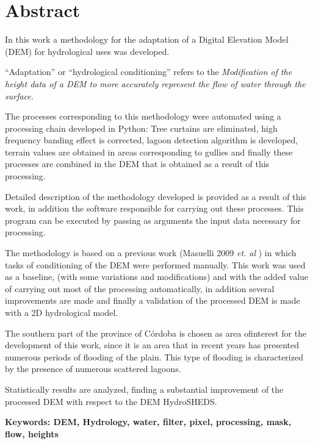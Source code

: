 \chapter*{Abstract}
\label{chap:abstract}

In this work a methodology for the adaptation of a Digital Elevation Model (DEM) for hydrological uses was developed.

"`Adaptation"' or "`hydrological conditioning"' refers to the \textit {Modification of the height data of a DEM to more accurately represent the flow of water through the surface.}

The processes corresponding to this methodology were automated using a processing chain developed in Python: Tree curtains are eliminated, high frequency banding effect is corrected, lagoon detection algorithm is developed, terrain values ​​are obtained in areas corresponding to gullies and finally these processes are combined in the DEM that is obtained as a result of this processing.

Detailed description of the methodology developed is provided as a result of this work, in addition the software responsible for carrying out these processes. This program can be executed by passing as arguments the input data necessary for processing.

The methodology is based on a previous work (Masuelli 2009 \textit {et. al} \cite{Masuelli2009}) in which tasks of conditioning of the DEM were performed manually. This work was used as a baseline, (with some variations and modifications) and with the added value of carrying out most of the processing automatically, in addition several improvements are made and finally a validation of the processed DEM is made with a 2D hydrological model.

The southern part of the province of Córdoba is chosen as area of ​​interest for the development of this work, since it is an area that in recent years has presented numerous periods of flooding of the plain. This type of flooding is characterized by the presence of numerous scattered lagoons.

Statistically results are analyzed, finding a substantial improvement of the processed DEM with respect to the DEM HydroSHEDS.

\textbf{Keywords: DEM, Hydrology, water, filter, pixel, processing, mask, flow, heights}